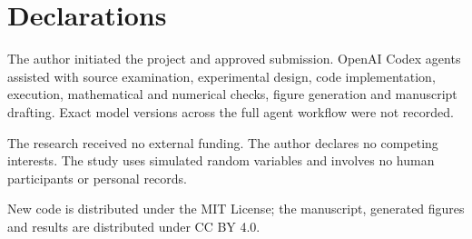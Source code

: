 \section{Declarations}

The author initiated the project and approved submission. OpenAI Codex agents assisted with source examination, experimental design, code implementation, execution, mathematical and numerical checks, figure generation and manuscript drafting. Exact model versions across the full agent workflow were not recorded.

The research received no external funding. The author declares no competing interests. The study uses simulated random variables and involves no human participants or personal records.

New code is distributed under the MIT License; the manuscript, generated figures and results are distributed under CC BY 4.0.

\nocite{robert1995,robert2009,massart1990,botev2016}
